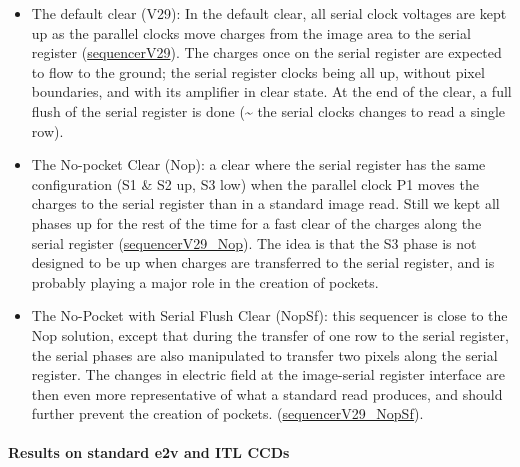 \begin{itemize}
\tightlist
\item
  The default clear (V29): In the default clear, all serial clock voltages are
  kept up as the parallel clocks move charges from the image area to the
  serial register (\href{https://github.com/lsst-camera-dh/sequencer-files/blob/master/run7/FP_E2V_2s_l3cp_v29.seq}{sequencerV29}). The
  charges once on the serial register are expected to flow to the ground;
  the serial register clocks being all up, without pixel boundaries, and
  with its amplifier in clear state. At the end of the clear, a full
  flush of the serial register is done (\textasciitilde{} the serial
  clocks changes to read a single row).
\item
  The No-pocket Clear (Nop): a clear where the serial register has the
  same configuration (S1 \& S2 up, S3 low) when the parallel clock P1
  moves the charges to the serial register than in a standard image read. Still we kept all phases up for the rest of the time for a fast clear
  of the charges along the serial register
  (\href{https://github.com/lsst-camera-dh/sequencer-files/blob/master/run7/FP_E2V_2s_l3cp_v29_Nop.seq}{sequencerV29\_Nop}). The idea is
  that the S3 phase is not designed to be up when charges are transferred
  to the serial register, and is probably playing a major role in the creation of pockets.
\item
  The No-Pocket with Serial Flush Clear (NopSf): this sequencer is close
  to the Nop solution, except that during the transfer of one row to
  the serial register, the serial phases are also manipulated to transfer two
  pixels along the serial register. The changes in electric field at the
  image-serial register interface are then even more representative of
  what a standard read produces, and should further prevent the
  creation of pockets.
  (\href{https://github.com/lsst-camera-dh/sequencer-files/blob/master/run7/FP_E2V_2s_l3cp_v29_NopSf.seq}{sequencerV29\_NopSf}).
\end{itemize}


\paragraph{Results on standard e2v and ITL CCDs}\label{results-on-standard-e2v-and-itl-ccd}

